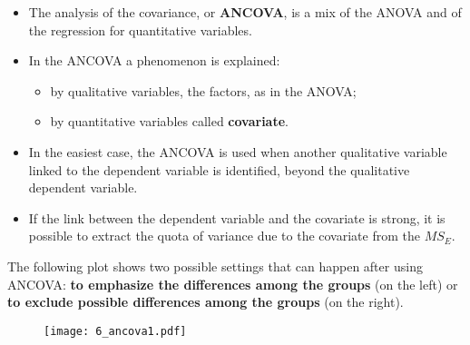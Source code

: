 
\begin{frame}
  \begin{itemize}
    \item The analysis of the covariance, or \textbf{ANCOVA}, is a mix of the ANOVA and of the regression for quantitative variables.
    \vspace{0.2cm}
    \item In the ANCOVA a phenomenon is explained:
    \begin{itemize}
      \item by qualitative variables, the factors, as in the ANOVA;
      \item by quantitative variables called \textbf{covariate}.
    \end{itemize}
    \vspace{0.2cm}
    \item In the easiest case, the ANCOVA is used when another qualitative variable linked to the dependent variable is identified, beyond the qualitative dependent variable.
    \vspace{0.2cm}
    \item If the link between the dependent variable and the covariate is strong, it is possible to extract the quota of variance due to the covariate from the $ MS_E $.
  \end{itemize}
\end{frame}

\begin{frame}
  The following plot shows two possible settings that can happen after using ANCOVA: \textbf{to emphasize the differences among the groups} (on the left) or \textbf{to exclude possible differences among the groups} (on the right).\\
  \vspace{-.65cm}
  \begin{figure}
    \texttt{[image: 6\_ancova1.pdf]}
  \end{figure}
\end{frame}

